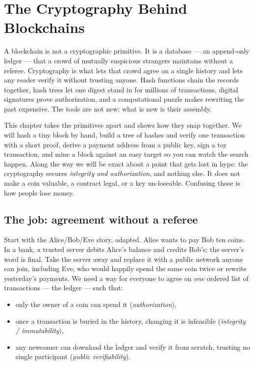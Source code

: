 \chapter{The Cryptography Behind Blockchains}

A blockchain is not a cryptographic primitive. It is a database --- an append-only ledger --- that a crowd of mutually suspicious strangers maintains without a referee. Cryptography is what lets that crowd agree on a single history and lets any reader verify it without trusting anyone. Hash functions chain the records together, hash trees let one digest stand in for millions of transactions, digital signatures prove authorization, and a computational puzzle makes rewriting the past expensive. The tools are not new; what is new is their assembly.

This chapter takes the primitives apart and shows how they snap together. We will hash a tiny block by hand, build a tree of hashes and verify one transaction with a short proof, derive a payment address from a public key, sign a toy transaction, and mine a block against an easy target so you can watch the search happen. Along the way we will be exact about a point that gets lost in hype: the cryptography secures \emph{integrity and authorization}, and nothing else. It does not make a coin valuable, a contract legal, or a key un-loseable. Confusing those is how people lose money.

\chapterline

\section{The job: agreement without a referee}
\label{ch36:job}

Start with the Alice/Bob/Eve story, adapted. Alice wants to pay Bob ten coins. In a bank, a trusted server debits Alice's balance and credits Bob's; the server's word is final. Take the server away and replace it with a public network anyone can join, including Eve, who would happily spend the same coin twice or rewrite yesterday's payments. We need a way for everyone to agree on \emph{one} ordered list of transactions --- the ledger --- such that:

\begin{itemize}
  \item only the owner of a coin can spend it (\emph{authorization}),
  \item once a transaction is buried in the history, changing it is infeasible (\emph{integrity / immutability}),
  \item any newcomer can download the ledger and verify it from scratch, trusting no single participant (\emph{public verifiability}).
\end{itemize}

